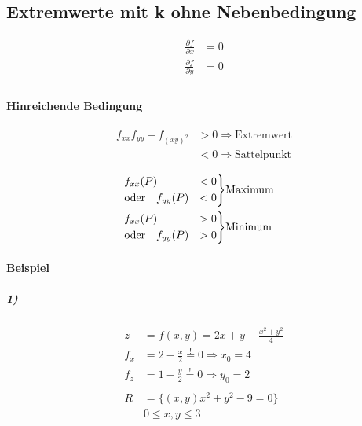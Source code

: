 \subsection{Extremwerte mit k ohne Nebenbedingung}

\begin{align*}
	\frac{\partial f}{\partial x} & = 0 \\
	\frac{\partial f}{\partial y} & = 0 \\
\end{align*}

\paragraph{Hinreichende Bedingung}


\begin{align*}
	f_{xx} f_{yy} - f_{{(xy)}^2} & > 0 \Rightarrow \text{Extremwert}  \\
	                             & < 0 \Rightarrow \text{Sattelpunkt}
\end{align*}

\begin{align*}
	\begin{rcases}
		f_{xx} (P) &< 0 \\
		\text{oder}\quad f_{yy} (P) &< 0
	\end{rcases}
	 & \text{Maximum} \\
	\begin{rcases}
		f_{xx} (P) &> 0 \\
		\text{oder}\quad f_{yy} (P) &> 0
	\end{rcases}
	 & \text{Minimum}
\end{align*}

\paragraph{Beispiel}

\subparagraph{1)}

\begin{align*}
	z   & = f(x, y) = 2x + y - \frac{x^2 + y^2}{4}               \\
	f_x & = 2 - \frac{x}{2} \overset{!}{=} 0 \Rightarrow x_0 = 4 \\
	f_z & = 1 - \frac{y}{2} \overset{!}{=} 0 \Rightarrow y_0 = 2 \\
	\\
	R   & = \{ (x, y) x^2 + y^2 - 9 = 0 \}                       \\
	    & 0 \leq x, y \leq 3
\end{align*}

